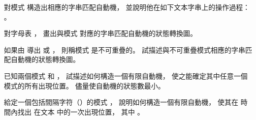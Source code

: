 \startsection[
  title={String matching with finite automata},
]

\startEXERCISE
對模式  構造出相應的字串匹配自動機，
並說明他在如下文本字串上的操作過程： 。
\stopEXERCISE

\startANSWER
{}
\stopANSWER

\startEXERCISE
對字母表 ，
畫出與模式  對應的字串匹配自動機的狀態轉換圖。
\stopEXERCISE

\startANSWER
{}
\stopANSWER

\startEXERCISE
如果由  導出  或 ，
則稱模式  是{\EMP 不可重疊的}。
試描述與不可重疊模式相應的字串匹配自動機的狀態轉換圖。
\stopEXERCISE

\startANSWER
{}
\stopANSWER

\startEXERCISE
已知兩個模式  和 ，
試描述如何構造一個有限自動機，
使之能確定其中任意一個模式的所有出現位置。
儘量使自動機的狀態數最小。
\stopEXERCISE

\startANSWER
{}
\stopANSWER

\startEXERCISE
給定一個包括間隔字符（\inexercise[32.1-4]）的模式 ，
說明如何構造一個有限自動機，
使其在  時間內找出  在文本  中的一次出現位置，
其中 。
\stopEXERCISE

\startANSWER
{}
\stopANSWER


\stopsection
